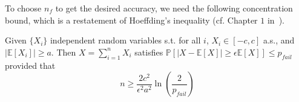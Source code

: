 To choose $n_f$ to get the desired accuracy, we need the following concentration bound, which is a restatement of Hoeffding's inequality (cf. Chapter $1$ in~\cite{dubhashi2009concentration}).
\begin{lemma}
\label{lem:hoeff}
Given $\{X_i\}$ independent random variables s.t. for all $i$, $X_i \in [-c, c]$ a.s., and $|\mathbb{E}[X_i]| \geq a$. 
Then $X = \sum_{i= 1}^n X_i$ satisfies
$\mathbb{P}[|X - \mathbb{E}[X]| \geq \epsilon \mathbb{E}[X] ] \leq p_{fail}$ provided that
$$n \geq \frac{2c^2}{\epsilon^2 a^2}\ln\left(\frac{2}{p_{fail}} \right)$$
\end{lemma}

\begin{comment}
\begin{proof}
Let $X = \sum_{i=1}^n X_i$.  Since $E[X] = nE[X_i]$, $E[X] \geq n \epsilon a$. Let $t = \epsilon a$.
\begin{align*}
\mathbb{P}\left[|X - \mathbb{E}[X]| \geq \epsilon \mathbb{E}[X] \right] 
&\leq \mathbb{P}\left[|X - \mathbb{E}[X]| \geq nt \right] \\
&= \mathbb{P}\left[\left|\frac{1}{n}X - \frac{1}{n}\mathbb{E}[X]\right| \geq t \right]  
\end{align*}
Applying Hoeffding's inequality to the rightmost term above, we obtain
  \[\mathbb{P}\left[|X - \mathbb{E}[X]| \geq \epsilon \mathbb{E}[X] \right] \leq 2\exp \left(-\frac{2n^2t^2}{\sum_{i=1}^n(b_i - a_i)^2}\right) \]
  Hence substituting the values for $t$ and $b_i = c$, $a_i = -c$ gives us:
\[\mathbb{P}\left[|X - \mathbb{E}[X]| \geq \epsilon \mathbb{E}[X] \right] \leq 2\exp \left(-\frac{2n^2\epsilon^2a^2}{n(4c^2)}\right) \]
Now set this upperbound to $p_{fail}$ to obtain the relation:
$$ \frac{n \epsilon^2 a^2}{2c^2} = \ln\left(\frac{2}{p_{fail}} \right) $$
Thus, for $n \geq \frac{2c^2}{\epsilon^2 a^2}\ln\left(\frac{2}{p_{fail}} \right)$, we are guaranteed that $\mathbb{P}\left[|X - \mathbb{E}[X]| \geq \epsilon \mathbb{E}[X] \right] \leq p_{fail}$.

Note that if we require the failure conditions to hold for $\lm$ sets of $X's$, then we perform a simple union bound which adds a $\lm$ in the $\frac{2}{p_{fail}}$ term.
\end{proof} 
\end{comment}


